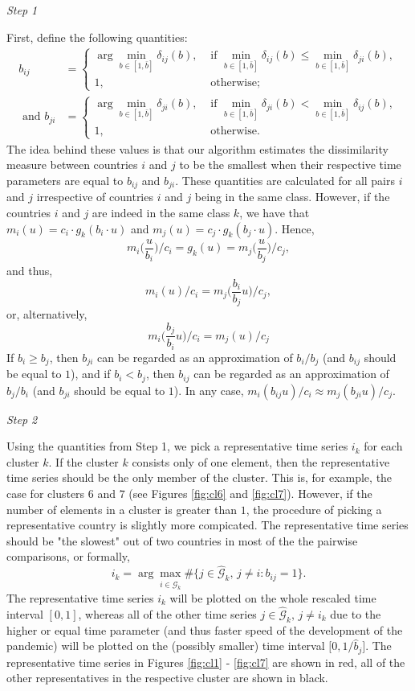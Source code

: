 \documentclass[a4paper,11pt]{article}
\numberwithin{equation}{section}
\begin{document}
\newpage
\textit{Step 1}

First, define the following quantities:
\begin{align*}
b_{ij} &= \begin{cases}
\arg \min_{b \in [1, \bar{b}]} \delta_{ij}(b),  &\text{ if } \min_{b \in [1, \bar{b}]} \delta_{ij}(b) \leq \min_{b \in [1, \bar{b}]} \delta_{ji}(b), \\
1, &\text{ otherwise};
\end{cases}\\
 \text{ and } b_{ji} &=\begin{cases}
\arg \min_{b \in [1, \bar{b}]} \delta_{ji}(b),  &\text{ if } \min_{b \in [1, \bar{b}]} \delta_{ji}(b) < \min_{b \in [1, \bar{b}]} \delta_{ij}(b), \\
1, &\text{ otherwise}.
\end{cases}
\end{align*}
The idea behind these values is that our algorithm estimates the dissimilarity measure between countries $i$ and $j$ to be the smallest when their respective time parameters are equal to $b_{ij}$ and $b_{ji}$. These quantities are calculated for all pairs $i$ and $j$ irrespective of countries $i$ and $j$ being in the same class. However, if the countries $i$ and $j$ are indeed in the same class $k$, we have that $m_i(u) = c_i \cdot g_k (b_i \cdot u)$ and $m_j(u) = c_j \cdot g_k( b_j \cdot u)$. Hence,
$$m_i \Big( \frac{u}{b_i} \Big) / c_i= g_k (u) = m_j \Big( \frac{u}{b_j} \Big) /c_j,$$
and thus,
$$m_i (u) / c_i = m_j \Big( \frac{b_i}{b_j} u \Big) /c_j,$$
or, alternatively,
$$m_i\Big( \frac{b_j}{b_i} u \Big) /c_i = m_j (u) / c_j$$
If $b_i \geq b_j$, then $b_{ji}$ can be regarded as an approximation of $b_i / b_j$ (and $b_{ij}$ should be equal to $1$), and if $b_i < b_j$, then $b_{ij}$ can be regarded as an approximation of $b_j/b_i$ (and $b_{ji}$ should be equal to $1$). In any case, $m_i( b_{ij} u ) /c_i \approx m_j (b_{ji} u) / c_j$.

\textit{Step 2}

Using the quantities from Step 1, we pick a representative time series $i_k$ for each cluster $k$. If the cluster $k$ consists only of one element, then the representative time series should be the only member of the cluster. This is, for example, the case for clusters $6$ and $7$ (see Figures \ref{fig:cl6} and \ref{fig:cl7}). However, if the number of elements in a cluster is greater than $1$, the procedure of picking a representative country is slightly more compicated. The representative time series should be "the slowest" out of two countries in most of the the pairwise comparisons, or formally,
$$i_k = \arg \max_{i \in \widehat{\mathcal{G}}_k} \# \{j \in \widehat{\mathcal{G}}_k, \, j\neq i: b_{ij} = 1\}.$$
The representative time series $i_k$ will be plotted on the whole rescaled time interval $[0, 1]$, whereas all of the other time series $j \in \widehat{\mathcal{G}}_k,\, j \neq i_k$ due to the higher or equal time parameter (and thus faster speed of the development of the pandemic) will be plotted on the (possibly smaller) time interval $\big[ 0, 1/\hat{b}_j \big]$. The representative time series in Figures \ref{fig:cl1} - \ref{fig:cl7} are shown in red, all of the other representatives in the respective cluster are shown in black.
\end{document}
